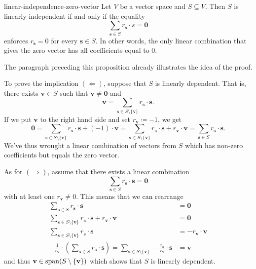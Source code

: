 \begin{proposition}{}{linear-independence-zero-vector}
 Let $V$ be a vector space and $S \subseteq V$. Then $S$ is linearly independent
 if and only if the equality
 \[
  \sum_{\mathbf{s} \in S} r_{\mathbf{s}} \cdot s = \mathbf{0}
 \]
 enforces $r_{\mathbf{s}} = 0$ for every $\mathbf{s} \in S$. In other words, the
 only linear combination that gives the zero vector has all coefficients equal
 to $0$.
\end{proposition}
\begin{propproof}
 The paragraph preceding this proposition already illustrates the idea of the
 proof.

 To prove the implication $( \Leftarrow )$, suppose that $S$ is linearly
 dependent. That is, there exists $\mathbf{v} \in S$ such that $\mathbf{v}
 \neq \mathbf{0}$ and
 \[
  \mathbf{v} = \sum_{\mathbf{s} \in S \setminus \{\mathbf{v}\}} r_{\mathbf{s}}
  \cdot \mathbf{s}.
 \]
 If we put $\mathbf{v}$ to the right hand side and set $r_{\mathbf{v}} \coloneqq
 -1$, we get
 \[
  \mathbf{0} = \sum_{\mathbf{s} \in S \setminus \{\mathbf{v}\}} r_{\mathbf{s}}
  \cdot \mathbf{s} + (-1) \cdot \mathbf{v} = \sum_{\mathbf{s} \in S \setminus
  \{\mathbf{v}\}} r_{\mathbf{s}} \cdot \mathbf{s} + r_{\mathbf{v}} \cdot
  \mathbf{v} = \sum_{\mathbf{s} \in S} r_{\mathbf{s}} \cdot \mathbf{s}.
 \]
 We've thus wrought a linear combination of vectors from $S$ which has non-zero
 coefficients but equals the zero vector.

 As for $( \Rightarrow )$, assume that there exists a linear combination
 \[
  \sum_{\mathbf{s} \in S} r_{\mathbf{s}} \cdot \mathbf{s} = \mathbf{0}
 \]
 with at least one $r_{\mathbf{v}} \neq 0$. This means that we can rearrange
 \begin{align*}
  \sum_{\mathbf{s} \in S} r_{\mathbf{s}} \cdot \mathbf{s} &= \mathbf{0}\\
  \sum_{\mathbf{s} \in S \setminus \{\mathbf{v}\}} r_{\mathbf{s}} \cdot
  \mathbf{s} + r_{\mathbf{v}} \cdot \mathbf{v} &= \mathbf{0}\\
  \sum_{\mathbf{s} \in S \setminus \{\mathbf{v}\}} r_{\mathbf{s}} \cdot
  \mathbf{s} &= -r_{\mathbf{v}} \cdot \mathbf{v}\\
  -\frac{1}{r_{\mathbf{v}}} \cdot  \left( \sum_{\mathbf{s} \in S} r_{\mathbf{s}}
 \cdot \mathbf{s}\right) = \sum_{\mathbf{s} \in S \setminus \{\mathbf{v}\}}
  -\frac{r_{\mathbf{s}}}{r_{\mathbf{v}}} \cdot \mathbf{s} &= \mathbf{v}
 \end{align*}
 and thus $\mathbf{v} \in \operatorname{span}(S \setminus \{\mathbf{v}\})$ which shows that $S$
 is linearly dependent.
\end{propproof}

